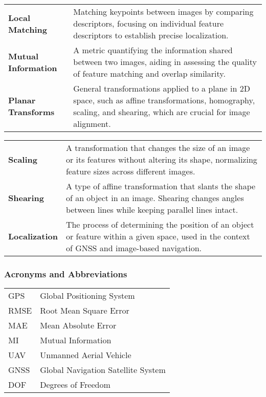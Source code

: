 \begin{tabularx}{\textwidth}{@{}p{2.5cm}L}
    \textbf{Local Matching} & 
    Matching keypoints between images by comparing descriptors, focusing on individual feature descriptors to establish precise localization. \\

    \textbf{Mutual Information} & 
    A metric quantifying the information shared between two images, aiding in assessing the quality of feature matching and overlap similarity. \\

    \textbf{Planar Transforms} & 
    General transformations applied to a plane in 2D space, such as affine transformations, homography, scaling, and shearing, which are crucial for image alignment. \\

\end{tabularx}
    \endgroup

\begingroup
\renewcommand{\arraystretch}{1.2}
\begin{tabularx}{\textwidth}{@{}p{2.5cm}L}

\textbf{Scaling} & 
A transformation that changes the size of an image or its features without altering its shape, normalizing feature sizes across different images. \\

\textbf{Shearing} & 
A type of affine transformation that slants the shape of an object in an image. Shearing changes angles between lines while keeping parallel lines intact. \\

\textbf{Localization} & 
The process of determining the position of an object or feature within a given space, used in the context of GNSS and image-based navigation. \\
\end{tabularx}
\endgroup

\newpage
\subsubsection*{Acronyms and Abbreviations}

\begingroup
\renewcommand{\arraystretch}{1.2}
\begin{tabular}{@{}p{2.5cm} l}
    GPS     & Global Positioning System \\
    RMSE    & Root Mean Square Error \\
    MAE     & Mean Absolute Error \\
    MI      & Mutual Information \\
    UAV     & Unmanned Aerial Vehicle \\
    GNSS    & Global Navigation Satellite System \\
    DOF     & Degrees of Freedom \\
\end{tabular}
\endgroup

